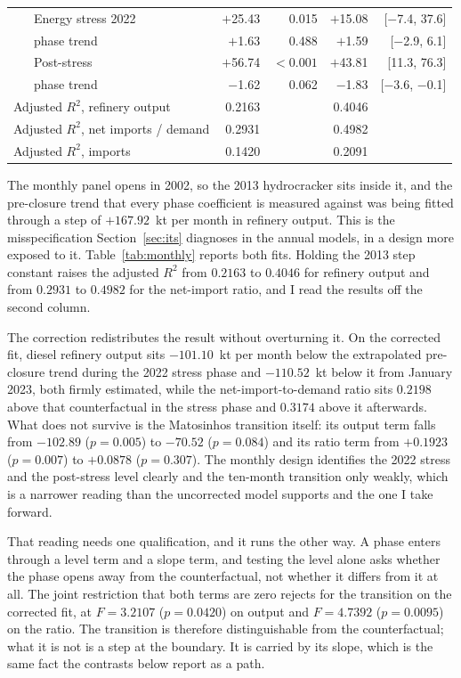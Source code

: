 \documentclass[11pt,a4paper]{article}
\begin{document}
\begin{table}[htbp]
\begin{tabular}{llrrrr}
 & Energy stress 2022 & $+$25.43 & 0.015 & $+$15.08 & [$-$7.4, 37.6] \\
 & \quad phase trend & $+$1.63 & 0.488 & $+$1.59 & [$-$2.9, 6.1] \\
 & Post-stress & $+$56.74 & $<0.001$ & $+$43.81 & [11.3, 76.3] \\
 & \quad phase trend & $-$1.62 & 0.062 & $-$1.83 & [$-$3.6, $-$0.1] \\
\midrule
\multicolumn{2}{l}{Adjusted $R^2$, refinery output} & 0.2163 & & 0.4046 & \\
\multicolumn{2}{l}{Adjusted $R^2$, net imports / demand} & 0.2931 & & 0.4982 & \\
\multicolumn{2}{l}{Adjusted $R^2$, imports} & 0.1420 & & 0.2091 & \\
\bottomrule
\end{tabular}
\end{table}

The monthly panel opens in 2002, so the 2013 hydrocracker sits inside it, and the pre-closure
trend that every phase coefficient is measured against was being fitted through a step of
$+167.92$~kt per month in refinery output. This is the misspecification Section~\ref{sec:its}
diagnoses in the annual models, in a design more exposed to it. Table~\ref{tab:monthly} reports
both fits. Holding the 2013 step constant raises the adjusted $R^2$ from $0.2163$ to $0.4046$
for refinery output and from $0.2931$ to $0.4982$ for the net-import ratio, and I read the
results off the second column.

The correction redistributes the result without overturning it. On the corrected fit, diesel
refinery output sits $-101.10$~kt per month below the extrapolated pre-closure trend during the
2022 stress phase and $-110.52$~kt below it from January 2023, both firmly estimated, while the
net-import-to-demand ratio sits $0.2198$ above that counterfactual in the stress phase and
$0.3174$ above it afterwards. What does not survive is the Matosinhos transition itself: its
output term falls from $-102.89$ ($p=0.005$) to $-70.52$ ($p=0.084$) and its ratio term from
$+0.1923$ ($p=0.007$) to $+0.0878$ ($p=0.307$). The monthly design identifies the 2022 stress
and the post-stress level clearly and the ten-month transition only weakly, which is a narrower
reading than the uncorrected model supports and the one I take forward.

That reading needs one qualification, and it runs the other way. A phase enters through a level
term and a slope term, and testing the level alone asks whether the phase opens away from the
counterfactual, not whether it differs from it at all. The joint restriction that both terms are
zero rejects for the transition on the corrected fit, at $F=3.2107$ ($p=0.0420$) on output and
$F=4.7392$ ($p=0.0095$) on the ratio. The transition is therefore distinguishable from the
counterfactual; what it is not is a step at the boundary. It is carried by its slope, which is
the same fact the contrasts below report as a path.
\end{document}
